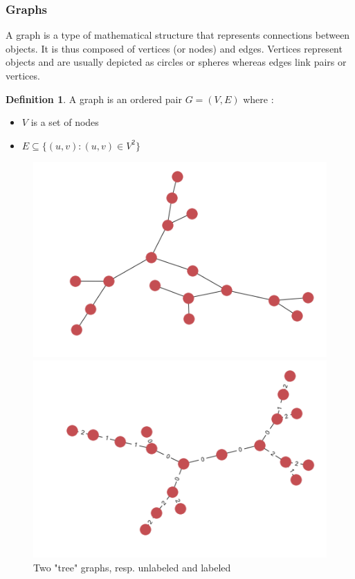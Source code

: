 \documentclass{article}
\theoremstyle{definition}
\newtheorem{definition}{Definition}
\begin{document}
\subsubsection{Graphs}
A graph\cite{graph_wiki} is a type of mathematical structure that represents connections between objects. It is thus composed of vertices (or nodes) and edges. Vertices represent objects and are usually depicted as circles or spheres whereas edges link pairs or vertices. 
\begin{definition}
	A graph is an ordered pair $G=(V,E)$ where :
	\begin{itemize}
		\item $V$ is a set of nodes
		\item $E \subseteq \{(u,v) : (u,v) \in V^2\}$
	\end{itemize}
\end{definition}
\begin{figure}[!htb]
\begin{multicols}{2}
    \includegraphics[width=\linewidth]{data/graphs/big_graph_no_label.png}\par
    \includegraphics[width=\linewidth]{data/graphs/big_graph_label.png}\par
\end{multicols}
\caption{Two "tree" graphs, resp. unlabeled and labeled}
\end{figure}
\end{document}

